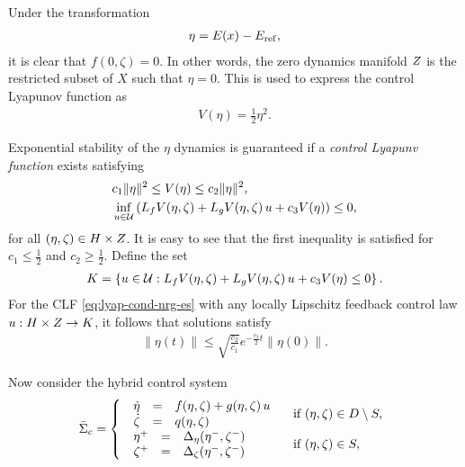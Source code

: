 \documentclass[twocolumn]{article}
\begin{document}
Under the transformation
\begin{align}
  \eta = E(x) - E_{\mathrm{ref}},
\end{align}
it is clear that $f(0, \zeta) = 0$.
%
In other words, the zero dynamics manifold $Z$ is the restricted subset of $X$ such that $\eta = 0$.
%
This is used to express the control Lyapunov function as
\begin{align}
  V(\eta) = \frac{1}{2} \eta^{2}.
\end{align}

Exponential stability of the $\eta$ dynamics is guaranteed if a {\em control Lyapunv function} exists satisfying
\begin{align}
  \label{eq:lyap-cond-nrg-es}
  &c_{1} \| \eta \|^{2} \leq V(\eta) \leq c_{2} \| \eta \|^2,\\
  \nonumber
  &\inf_{u \in \mathcal{U}} \left( L_{f} V(\eta, \zeta) + L_{g} V(\eta, \zeta) \, u + c_{3} V(\eta) \right) \leq 0,
\end{align}
for all $(\eta, \zeta) \in H \times Z$.
%
It is easy to see that the first inequality is satisfied for $c_{1} \leq \frac{1}{2}$ and $c_{2} \geq \frac{1}{2}$.
%
Define the set
\begin{align}
  K = \left\{ u \in \mathcal{U} : L_{f} V(\eta, \zeta) + L_{g} V(\eta, \zeta) \, u + c_{3} V(\eta) \leq 0 \right\}.
\end{align}
For the CLF \eqref{eq:lyap-cond-nrg-es} with any locally Lipschitz feedback control law $u : H \times Z \to K$, it follows that solutions satisfy
\begin{align*}
  \| \eta(t) \| \leq \sqrt{\frac{c_{2}}{c_{1}}} e^{-\frac{c_{3}}{2} t} \| \eta(0) \|.
\end{align*}

Now consider the hybrid control system
\begin{align}
  \label{eq:hcsys}
  {\bar \Sigma}_{c} = \left\{
  \begin{array}{l l}
    \begin{array}{r c l}
      {\dot \eta} &=& f(\eta, \zeta) + g(\eta, \zeta) \, u\\
      {\dot \zeta} &=& q(\eta, \zeta)
    \end{array} & \mbox{ if } (\eta, \zeta) \in D \setminus S,\\
    \begin{array}{r c l}
      \eta^{+} &=& \Delta_{\eta}(\eta^{-}, \zeta^{-})\\
      \zeta^{+} &=& \Delta_{\zeta}(\eta^{-}, \zeta^{-})
    \end{array} & \mbox{ if } (\eta, \zeta) \in S,
  \end{array}\right.
\end{align}
\end{document}
